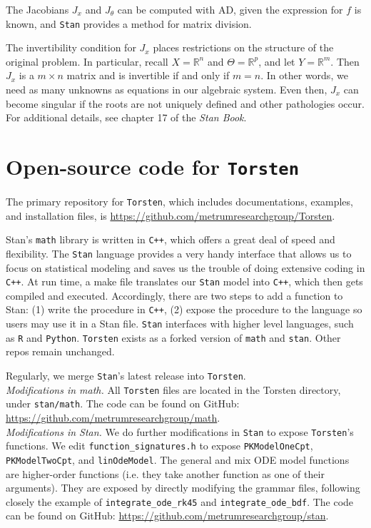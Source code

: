 \documentclass[11pt]{article}
\begin{document}
The Jacobians $J_x$ and $J_\theta$ can be computed with AD,
given the expression for $f$ is known, and \texttt{Stan} provides a method for matrix division. 

The invertibility condition for $J_x$ places restrictions on the structure of the
original problem. In particular, recall $X = \mathbb{R}^n$ and $\Theta = \mathbb{R}^p$,
and let $Y = \mathbb{R}^m$. Then $J_x$ is a $m \times n$ matrix and is invertible
if and only if $m = n$. In other words, we need as many unknowns as equations in our
algebraic system. Even then, $J_x$ can become singular if the roots are not uniquely
defined and other pathologies occur. For additional details, see chapter 17 of the \textit{Stan Book}.

\section{Open-source code for \texttt{Torsten}}

The primary repository for \texttt{Torsten}, which includes documentations, examples,
and installation files, is \url{https://github.com/metrumresearchgroup/Torsten}.

Stan's \texttt{math} library is written in \texttt{C++}, which offers a great deal of speed and 
flexibility. The \texttt{Stan} language provides a very handy interface that allows us to focus 
on statistical modeling and saves us the trouble of doing extensive coding in \texttt{C++}.
%
At run time, a make file translates our \texttt{Stan} model into \texttt{C++}, which then gets compiled 
and executed. Accordingly, there are two steps to add a function to Stan: (1) write the 
procedure in \texttt{C++}, (2) expose the procedure to the language so users may use it in a 
Stan file.
%
\texttt{Stan} interfaces with higher level languages, such as \texttt{R} and \texttt{Python}. 
\texttt{Torsten} exists as a forked 
version of \texttt{math} and \texttt{stan}. Other repos remain unchanged.

Regularly, we merge \texttt{Stan}'s latest release into \texttt{Torsten}. \\


\textit{Modifications in math.} All \texttt{Torsten} files are located in 
the Torsten directory, under \texttt{stan/math}. The
code can be found on GitHub: \\ \url{https://github.com/metrumresearchgroup/math}. \\

\textit{Modifications in Stan.} We do further modifications in \texttt{Stan} to expose \texttt{Torsten}'s 
functions. We edit \texttt{function\_signatures.h} to expose \texttt{PKModelOneCpt}, \texttt{PKModelTwoCpt}, 
and \texttt{linOdeModel}. The general and mix ODE model functions are higher-order functions (i.e. they 
take another function as one of their arguments). They are exposed by directly modifying 
the grammar files, following closely the example of \texttt{integrate\_ode\_rk45} and \texttt{integrate\_ode\_bdf}.
The code can be found on GitHub: \url{https://github.com/metrumresearchgroup/stan}.


% 
% 


\end{document}

